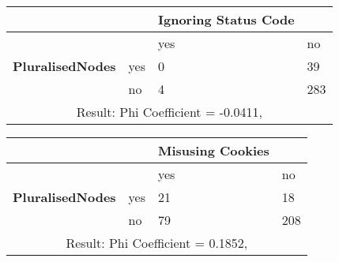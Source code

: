 \documentclass[a4paper,12pt]{article}
\begin{document}
\begin{center}
  \begin{tabular}{| p{60mm} | p{10mm} | p{35mm} | p{35mm} |}
  \hline
   & & \textbf{Ignoring Status Code} &
  \\
  \hline
  & & yes & no
  \\
  \hline
  \textbf{PluralisedNodes} & yes & 0 & 39
  \\
  \hline
   & no & 4 & 283
  \\
  \hline
  \multicolumn{4}{|c|}{Result: Phi Coefficient = -0.0411, }
  \\ \hline
  \end{tabular}
  \end{center}

\begin{center}
  \begin{tabular}{| p{60mm} | p{10mm} | p{35mm} | p{35mm} |}
  \hline
   & & \textbf{Misusing Cookies} &
  \\
  \hline
  & & yes & no
  \\
  \hline
  \textbf{PluralisedNodes} & yes & 21 & 18
  \\
  \hline
   & no & 79 & 208
  \\
  \hline
  \multicolumn{4}{|c|}{Result: Phi Coefficient = 0.1852, }
  \\ \hline
  \end{tabular}
  \end{center}
\end{document}
